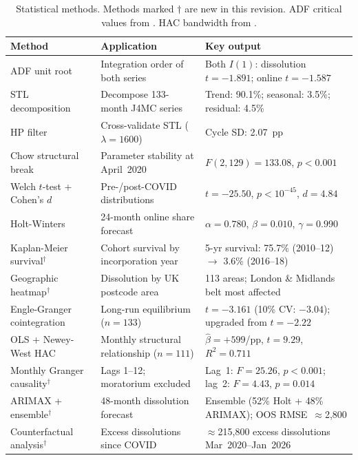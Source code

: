 \documentclass[12pt,a4paper]{article}
\begin{document}
\begin{table}[H]
\centering
\caption{Statistical methods. Methods marked $\dagger$ are new in this revision.
ADF critical values from \citet{MacKinnon1994}. HAC bandwidth from \citet{NeweyWest1987}.}
\label{tab:methods}
\small{}
\begin{tabular}{@{}L{3.5cm}L{4.0cm}L{5.8cm}@{}}
\toprule
{}\color{white}\textbf{Method} &
\color{white}\textbf{Application} &
\color{white}\textbf{Key output} \\
\midrule
ADF unit root \citep{DickeyFuller1979} & Integration order of both series &
Both $I(1)$: dissolution $t=-1.891$; online $t=-1.587$ \\
STL decomposition \citep{Cleveland1990} & Decompose 133-month J4MC series &
Trend: 90.1\%; seasonal: 3.5\%; residual: 4.5\% \\
HP filter \citep{HodrickPrescott1997} & Cross-validate STL ($\lambda=1600$) & Cycle SD: 2.07~pp \\
Chow structural break \citep{Chow1960} & Parameter stability at April~2020 & $F(2,129)=133.08$, $p<0.001$ \\
Welch $t$-test + Cohen's $d$ & Pre-/post-COVID distributions & $t=-25.50$, $p<10^{-45}$, $d=4.84$ \\
Holt-Winters \citep{Winters1960} & 24-month online share forecast & $\alpha=0.780$, $\beta=0.010$, $\gamma=0.990$ \\
Kaplan-Meier survival$^\dagger$ \citep{KaplanMeier1958} & Cohort survival by incorporation year &
5-yr survival: 75.7\% (2010--12) $\to$ 3.6\% (2016--18) \\
Geographic heatmap$^\dagger$ & Dissolution by UK postcode area &
113 areas; London \& Midlands belt most affected \\
Engle-Granger cointegration \citep{EngleGranger1987} & Long-run equilibrium ($n=133$) &
$t=-3.161$ (10\% CV: $-3.04$); upgraded from $t=-2.22$ \\
OLS + Newey-West HAC \citep{NeweyWest1987} & Monthly structural relationship ($n=111$) &
$\hat\beta=+599$/pp, $t=9.29$, $R^2=0.711$ \\
Monthly Granger causality$^\dagger$ \citep{Granger1969} & Lags 1--12; moratorium excluded &
Lag~1: $F=25.26$, $p<0.001$; lag~2: $F=4.43$, $p=0.014$ \\
ARIMAX + ensemble$^\dagger$ & 48-month dissolution forecast &
Ensemble (52\% Holt + 48\% ARIMAX); OOS RMSE~$\approx$2,800 \\
Counterfactual analysis$^\dagger$ & Excess dissolutions since COVID &
$\approx$215,800 excess dissolutions Mar~2020--Jan~2026 \\
\bottomrule
\end{tabular}
\end{table}
\end{document}
